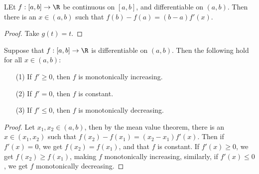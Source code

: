\begin{corollary}
    LEt $f:[a,b] \rightarrow \R$ be continuous on  $[a,b]$, and differentiable on  $(a,b)$. Then
    there is an $x \in (a,b)$ such that $f(b)-f(a)=(b-a)f'(x)$.
\end{corollary}
\begin{proof}
    Take $g(t)=t$.
\end{proof}

\begin{theorem}\label{6.2.3}
    Suppose that $f:[a,b] \rightarrow \R$ is differentiable on  $(a,b)$. Then the following hold
    for all $x \in (a,b)$:
         \begin{enumerate}
             \item[(1)] If $f' \geq 0$, then $f$ is monotonically increasing.

             \item[(2)] If $f'=0$, then  $f$ is constant.

             \item[(3)] If  $f' \leq 0$, then  $f$ is monotonically decreasing.
        \end{enumerate}
\end{theorem}
\begin{proof}
    Let $x_1,x_2 \in (a,b)$, then by the mean value theorem, there is an $x \in (x_1,x_2)$
    such that $f(x_2)-f(x_1)=(x_2-x_1)f'(x)$. Then if $f'(x)=0$, we get  $f(x_2)=f(x_1)$, and that
    $f$ is constant. If $f'(x) \geq 0$, we get  $f(x_2) \geq f(x_1)$, making $f$ monotonically increasing,
    similarly, if  $f'(x) \leq 0$, we get  $f$ monotonically decreasing.
\end{proof}

